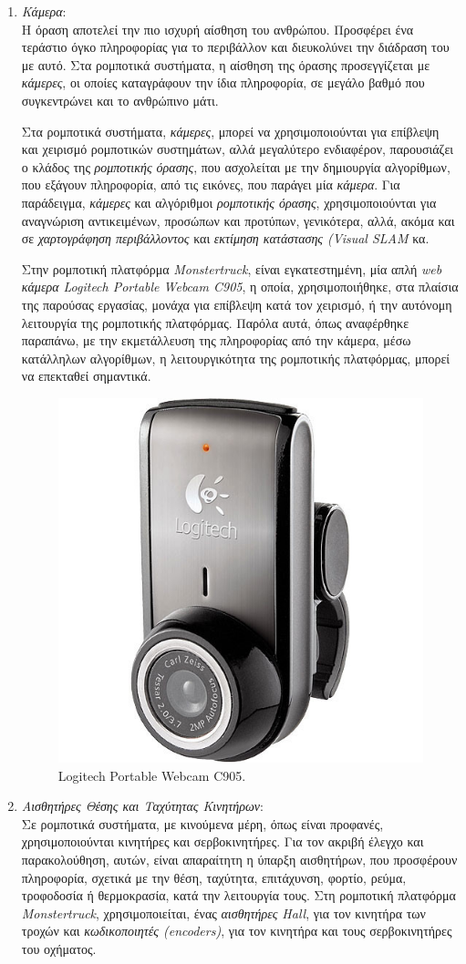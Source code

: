 \begin{enumerate}
\bigskip
\item \textit{Κάμερα}:\\
Η όραση αποτελεί την πιο ισχυρή αίσθηση του ανθρώπου. Προσφέρει ένα τεράστιο όγκο πληροφορίας για το περιβάλλον και διευκολύνει την διάδραση του με αυτό. Στα ρομποτικά συστήματα, η αίσθηση της όρασης προσεγγίζεται με \textit{κάμερες}, οι οποίες καταγράφουν την ίδια πληροφορία, σε μεγάλο βαθμό που συγκεντρώνει και το ανθρώπινο μάτι.

Στα ρομποτικά συστήματα, \textit{κάμερες}, μπορεί να χρησιμοποιούνται για επίβλεψη και χειρισμό ρομποτικών συστημάτων, αλλά μεγαλύτερο ενδιαφέρον, παρουσιάζει ο κλάδος της \textit{ρομποτικής όρασης}, που ασχολείται με την δημιουργία αλγορίθμων, που εξάγουν πληροφορία, από τις εικόνες, που παράγει μία \textit{κάμερα}. Για παράδειγμα, \textit{κάμερες} και αλγόριθμοι \textit{ρομποτικής όρασης}, χρησιμοποιούνται για αναγνώριση αντικειμένων, προσώπων και προτύπων, γενικότερα, αλλά, ακόμα και σε \textit{χαρτογράφηση περιβάλλοντος} και \textit{εκτίμηση κατάστασης (Visual SLAM} κα.

Στην ρομποτική πλατφόρμα \textit{Monstertruck}, είναι εγκατεστημένη, μία απλή \textit{web κάμερα Logitech Portable Webcam C905}, η οποία, χρησιμοποιήθηκε, στα πλαίσια της παρούσας εργασίας, μονάχα για επίβλεψη κατά τον χειρισμό, ή την αυτόνομη λειτουργία της ρομποτικής πλατφόρμας. Παρόλα αυτά, όπως αναφέρθηκε παραπάνω, με την εκμετάλλευση της πληροφορίας από την κάμερα, μέσω κατάλληλων αλγορίθμων, η λειτουργικότητα της ρομποτικής πλατφόρμας, μπορεί να επεκταθεί σημαντικά.

\begin{figure}[!ht]
	\centering
	\includegraphics[width=.3\linewidth]{Chapters/Chapter2/Figures/webcam.jpg}
	\caption{Logitech Portable Webcam C905.}
	\label{fig:webcam}
\end{figure}


\bigskip
\item \textit{Αισθητήρες Θέσης και Ταχύτητας Κινητήρων}:\\
Σε ρομποτικά συστήματα, με κινούμενα μέρη, όπως είναι προφανές, χρησιμοποιούνται κινητήρες και σερβοκινητήρες. Για τον ακριβή έλεγχο και παρακολούθηση, αυτών, είναι απαραίτητη η ύπαρξη αισθητήρων, που προσφέρουν πληροφορία, σχετικά με την θέση, ταχύτητα, επιτάχυνση, φορτίο, ρεύμα, τροφοδοσία ή θερμοκρασία, κατά την λειτουργία τους. Στη ρομποτική πλατφόρμα \textit{Monstertruck}, χρησιμοποιείται, ένας \textit{αισθητήρες Hall}, για τον κινητήρα των τροχών και \textit{κωδικοποιητές (encoders)}, για τον κινητήρα και τους σερβοκινητήρες του οχήματος. 


\end{enumerate}
